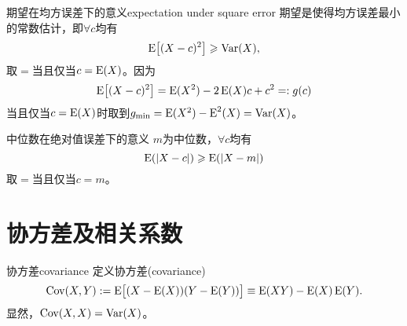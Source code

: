 
\begin{example}{期望在均方误差下的意义}{expectation under square error}
	期望是使得均方误差最小的常数估计，即$\forall c$均有
	\[
		\operatorname{E}\bigl[(X-c)^2\bigr]\geqslant\operatorname{Var}(X),
	\]
	取$=$当且仅当$c=\operatorname{E}(X)$。因为
	\begin{equation*}
		\operatorname{E}\bigl[(X-c)^2\bigr]=\operatorname{E}(X^2)-2\operatorname{E}(X)c+c^2=:g(c)
	\end{equation*}
	当且仅当$c=\operatorname{E}(X)$时取到$g_{\mathrm{min}}=\operatorname{E}(X^2)-\operatorname{E}^2(X)=\operatorname{Var}(X)$。
\end{example}
\begin{example}{中位数在绝对值误差下的意义}{}
	$m$为中位数，$\forall c$均有
	\[
		\operatorname{E}(|X-c|)\geqslant\operatorname{E}(|X-m|)
	\]
	取$=$当且仅当$c=m$。
\end{example}
\section{协方差及相关系数}
\begin{definition}{协方差}{covariance}
	定义协方差(covariance)
	\begin{equation}
		\operatorname{Cov}(X,Y):=\operatorname{E}\bigl[(X-\operatorname{E}(X))(Y-\operatorname{E}(Y))\bigr]\equiv\operatorname{E}(XY)-\operatorname{E}(X)\operatorname{E}(Y).
	\end{equation}
	显然，$\operatorname{Cov}(X,X)=\operatorname{Var}(X)$。
\end{definition}

